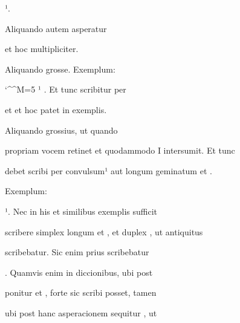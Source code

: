 \splitlines

  ¹.

\indentK Aliquando autem asperatur

\splitlines

et hoc multipliciter.

\indentK Aliquando grosse. Exemplum:  

\fulllines

\catcode `\^^M=5
\obeylines
{}  ¹ . Et tunc scribitur per  

\splitlines

 et  et hoc patet in exemplis.

Aliquando grossius, ut quando 

\fulllines

propriam vocem retinet et quodammodo I intersumit. Et tunc

debet scribi per  convulsum¹ aut longum geminatum et .


Exemplum:      

 ¹. Nec in his et similibus exemplis sufficit


scribere simplex  longum et , et duplex , ut antiquitus

scribebatur. Sic enim prius scribebatur  

. Quamvis enim in diccionibus, ubi post  


ponitur     et , forte sic scribi posset, tamen

ubi post hanc asperacionem sequitur , ut  

